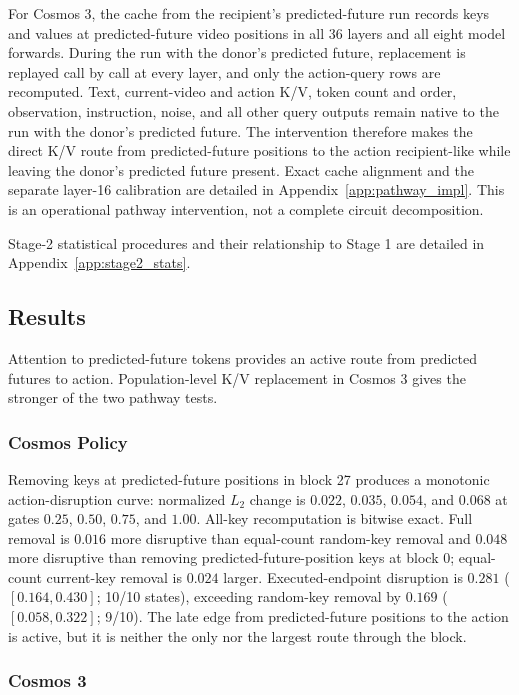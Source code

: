 \documentclass{article}
\newcommand{\kv}{K/V}
\begin{document}
For Cosmos 3, the cache from the recipient's predicted-future run records keys and values at predicted-future video positions in all 36 layers and all eight model forwards. During the run with the donor's predicted future, replacement is replayed call by call at every layer, and only the action-query rows are recomputed. Text, current-video and action K/V, token count and order, observation, instruction, noise, and all other query outputs remain native to the run with the donor's predicted future. The intervention therefore makes the direct K/V route from predicted-future positions to the action recipient-like while leaving the donor's predicted future present. Exact cache alignment and the separate layer-16 calibration are detailed in Appendix~\ref{app:pathway_impl}. This is an operational pathway intervention, not a complete circuit decomposition.

Stage-2 statistical procedures and their relationship to Stage 1 are detailed in Appendix~\ref{app:stage2_stats}.

\subsection{Results}
\label{sec:stage2_results}

Attention to predicted-future tokens provides an active route from predicted futures to action. Population-level \kv{} replacement in Cosmos 3 gives the stronger of the two pathway tests.

\subsubsection{Cosmos Policy}

Removing keys at predicted-future positions in block 27 produces a monotonic action-disruption curve: normalized $L_2$ change is $0.022$, $0.035$, $0.054$, and $0.068$ at gates $0.25$, $0.50$, $0.75$, and $1.00$. All-key recomputation is bitwise exact. Full removal is $0.016$ more disruptive than equal-count random-key removal and $0.048$ more disruptive than removing predicted-future-position keys at block 0; equal-count current-key removal is $0.024$ larger. Executed-endpoint disruption is $0.281$ ($[0.164,0.430]$; 10/10 states), exceeding random-key removal by $0.169$ ($[0.058,0.322]$; 9/10). The late edge from predicted-future positions to the action is active, but it is neither the only nor the largest route through the block.

\subsubsection{Cosmos 3}
\end{document}
